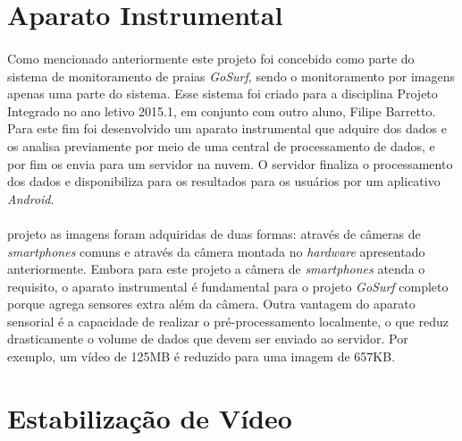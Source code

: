 \section{Aparato Instrumental}


\paragraph{}Como mencionado anteriormente este projeto foi concebido como parte do sistema de monitoramento de praias \textit{GoSurf}, sendo o monitoramento por imagens apenas uma parte do sistema. Esse sistema foi criado para a disciplina Projeto Integrado no ano letivo 2015.1, em conjunto com outro aluno, Filipe Barretto. Para este fim foi desenvolvido um aparato instrumental que adquire dos dados e os analisa previamente por meio de uma central de processamento de dados, e por fim os envia para um servidor na nuvem. O servidor finaliza o processamento dos dados e disponibiliza para os resultados para os usuários por um aplicativo \textit{Android}.

\paragraph{}


projeto as imagens foram adquiridas de duas formas: através de câmeras de \textit{smartphones} comuns e através da câmera montada no \textit{hardware} apresentado anteriormente. Embora para este projeto a câmera de \textit{smartphones} atenda o requisito, o aparato instrumental é fundamental para o projeto \textit{GoSurf} completo porque agrega sensores extra além da câmera. Outra vantagem do aparato sensorial é a capacidade de realizar o pré-processamento localmente, o que reduz drasticamente o volume de dados que devem ser enviado ao servidor. Por exemplo, um vídeo de 125MB é reduzido para uma imagem de 657KB.


\section{Estabilização de Vídeo}

